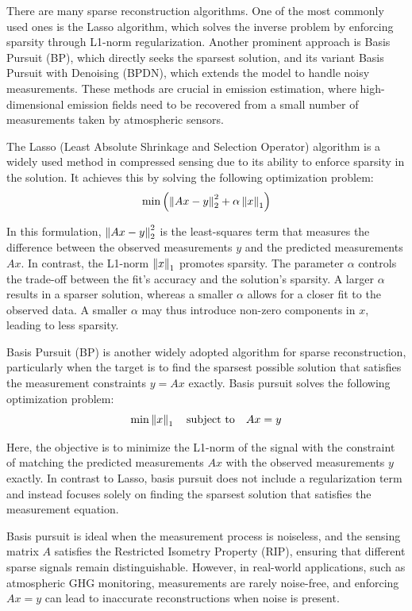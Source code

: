 There are many sparse reconstruction algorithms.
One of the most commonly used ones is the Lasso algorithm, which solves the inverse problem by enforcing sparsity through L1-norm regularization.
Another prominent approach is Basis Pursuit (BP), which directly seeks the sparsest solution, and its variant Basis Pursuit with Denoising (BPDN),  which extends the model to handle noisy measurements.
These methods are crucial in emission estimation, where high-dimensional emission fields need to be recovered from a small number of measurements taken by atmospheric sensors.

The Lasso (Least Absolute Shrinkage and Selection Operator) algorithm is a widely used method in compressed sensing due to its ability to enforce sparsity in the solution.
It achieves this by solving the following optimization problem:
\begin{equation}
    \min{\left( \left\lVert Ax -y \right\rVert_2^2 + \alpha\left\lVert x\right\rVert_1 \right)}
\end{equation}

In this formulation, $\left\lVert Ax -y \right\rVert_2^2$ is the least-squares term that measures the difference between the observed measurements $y$ and the predicted measurements $Ax$.
In contrast, the L1-norm $\left\lVert x\right\rVert_1$ promotes sparsity.
The parameter $\alpha$ controls the trade-off between the fit's accuracy and the solution's sparsity.
A larger $\alpha$ results in a sparser solution, whereas a smaller $\alpha$ allows for a closer fit to the observed data.
A smaller $\alpha$ may thus introduce non-zero components in $x$, leading to less sparsity.

Basis Pursuit (BP) is another widely adopted algorithm for sparse reconstruction, particularly when the target is to find the sparsest possible solution that satisfies the measurement constraints $y = Ax$ exactly.
Basis pursuit solves the following optimization problem:
\begin{equation}
    \min \left\lVert x\right\rVert_1 \quad \text{subject to} \quad  Ax = y
\end{equation}

Here, the objective is to minimize the L1-norm of the signal with the constraint of matching the predicted measurements $A x$ with the observed measurements $y$ exactly.
In contrast to Lasso, basis pursuit does not include a regularization term and instead focuses solely on finding the sparsest solution that satisfies the measurement equation.

Basis pursuit is ideal when the measurement process is noiseless, and the sensing matrix $A$ satisfies the Restricted Isometry Property (RIP), ensuring that different sparse signals remain distinguishable.
However, in real-world applications, such as atmospheric GHG monitoring, measurements are rarely noise-free, and enforcing $Ax = y$ can lead to inaccurate reconstructions when noise is present.

